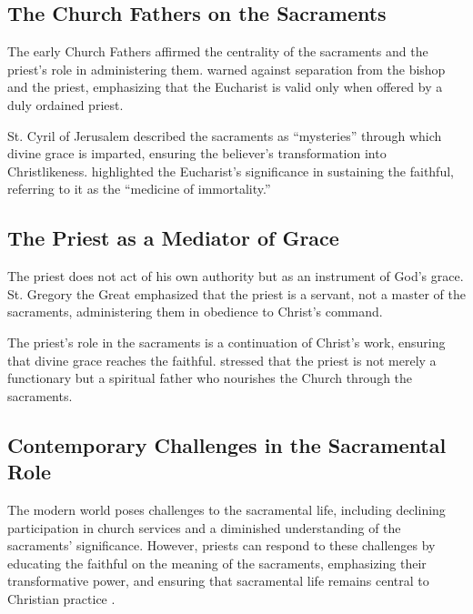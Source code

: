 \documentclass[12pt, doc]{apa7}   	%
\begin{document}
\subsection{The Church Fathers on the Sacraments}

The early Church Fathers affirmed the centrality of the sacraments and the priest’s role in administering them. \cite{epistles_ignatius} warned against separation from the bishop and the priest, emphasizing that the Eucharist is valid only when offered by a duly ordained priest. 

St. Cyril of Jerusalem \citep{early_church_akin} described the sacraments as ``mysteries'' through which divine grace is imparted, ensuring the believer’s transformation into Christlikeness. \citet{priesthood_chrysostom,complete_work_chrysostom} highlighted the Eucharist’s significance in sustaining the faithful, referring to it as the ``medicine of immortality.''

\subsection{The Priest as a Mediator of Grace}

The priest does not act of his own authority but as an instrument of God’s grace. St. Gregory the Great \citep{early_church_akin} emphasized that the priest is a servant, not a master of the sacraments, administering them in obedience to Christ’s command.

The priest’s role in the sacraments is a continuation of Christ’s work, ensuring that divine grace reaches the faithful. \citet{priesthood_shenouda} stressed that the priest is not merely a functionary but a spiritual father who nourishes the Church through the sacraments.

\subsection{Contemporary Challenges in the Sacramental Role}

The modern world poses challenges to the sacramental life, including declining participation in church services and a diminished understanding of the sacraments’ significance. However, priests can respond to these challenges by educating the faithful on the meaning of the sacraments, emphasizing their transformative power, and ensuring that sacramental life remains central to Christian practice \citep{eucharist_schmemann}.
\end{document}
